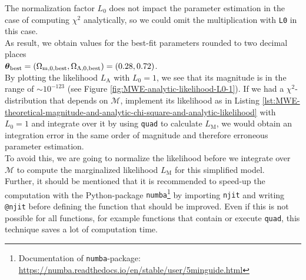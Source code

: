 \noindent The normalization factor $L_{0}$ does not impact the parameter estimation in the case of computing $\chi^{2}$ analytically, so we could omit the multiplication with \colorbox{backcolor}{\lstinline{L0}} in this case. \\
\noindent As result, we obtain values for the best-fit parameters rounded to two decimal places \\ ${\vb*{\theta}_{\text{best}} = (\Omega_{\text{m},0, \text{best}}, \Omega_{\Lambda, 0, \text{best}}) = (0.28, 0.72)}$. \\
\noindent By plotting the likelihood $L_{\text{A}}$ with $L_{0} = 1$, we see that its magnitude is in the range of  $\sim 10^{-123}$ (see Figure \ref{fig:MWE-analytic-likelihood-L0-1}). If we had a $\chi^2$-distribution that depends on $\mathcal{M}$, implement its likelihood as in Listing \ref{lst:MWE-theoretical-magnitude-and-analytic-chi-square-and-analytic-likelihood} with $L_{0} = 1$ and integrate over it by using \colorbox{backcolor}{\lstinline{quad}} to calculate $L_{\text{M}}$, we would obtain an integration error in the same order of magnitude and therefore erroneous parameter estimation.  \\
To avoid this, we are going to normalize the likelihood before we integrate over $\mathcal{M}$ to compute the marginalized likelihood $L_{\text{M}}$ for this simplified model. \\ 
Further, it should be mentioned that it is recommended to speed-up the computation with the Python-package \colorbox{backcolor}{\lstinline{numba}}\footnote{Documentation of \colorbox{backcolor}{\lstinline{numba}}-package: \href{https://numba.readthedocs.io/en/stable/user/5minguide.html}{https://numba.readthedocs.io/en/stable/user/5minguide.html}} by importing \colorbox{backcolor}{\lstinline{njit}} and writing \colorbox{backcolor}{\lstinline{@njit}} before defining the function that should be improved. Even if this is not possible for all functions, for example functions that contain or execute \colorbox{backcolor}{\lstinline{quad}}, this technique saves a lot of computation time. \\


